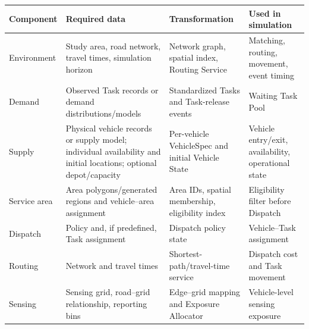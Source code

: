 \documentclass[11pt,a4paper]{article}
\begin{document}
\begin{center}
\scriptsize
\renewcommand{\arraystretch}{1.18}
\begin{tabularx}{\textwidth}{@{}p{1.65cm}Y Y Y@{}}
\toprule
\textbf{Component} & \textbf{Required data} & \textbf{Transformation} & \textbf{Used in simulation} \\
\midrule
Environment & Study area, road network, travel times, simulation horizon & Network graph, spatial index, Routing Service & Matching, routing, movement, event timing \\
Demand & Observed Task records or demand distributions/models & Standardized Tasks and Task-release events & Waiting Task Pool \\
Supply & Physical vehicle records or supply model; individual availability and initial locations; optional depot/capacity & Per-vehicle VehicleSpec and initial Vehicle State & Vehicle entry/exit, availability, operational state \\
Service area & Area polygons/generated regions and vehicle--area assignment & Area IDs, spatial membership, eligibility index & Eligibility filter before Dispatch \\
Dispatch & Policy and, if predefined, Task assignment & Dispatch policy state & Vehicle--Task assignment \\
Routing & Network and travel times & Shortest-path/travel-time service & Dispatch cost and Task movement \\
Sensing & Sensing grid, road--grid relationship, reporting bins & Edge--grid mapping and Exposure Allocator & Vehicle-level sensing exposure \\
\bottomrule
\end{tabularx}
\end{center}
\end{document}
